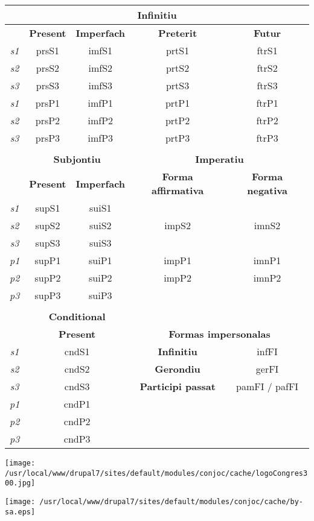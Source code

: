\documentclass[10pt,a4paper,final]{article}
\begin{document}
\begin{tabular}{|c|c|c|c|c|}
\hline 
\multicolumn{5}{|c|}{\textbf{Infinitiu}} \\ 
\hline 
 & \textbf{Present} & \textbf{Imperfach} & \textbf{Preterit} & \textbf{Futur} \\ 
\hline 
\textit{s1} & prsS1 & imfS1 & prtS1 & ftrS1 \\ 
\hline 
\textit{s2} & prsS2 & imfS2 & prtS2 & ftrS2 \\ 
\hline 
\textit{s3} & prsS3 & imfS3 & prtS3 & ftrS3 \\ 
\hline 
\textit{s1} & prsP1 & imfP1 & prtP1 & ftrP1 \\ 
\hline 
\textit{s2} & prsP2 & imfP2 & prtP2 & ftrP2 \\ 
\hline 
\textit{s3} & prsP3 & imfP3 & prtP3 & ftrP3 \\ 
\hline 
\multicolumn{5}{|c|}{} \\ 
\hline 
 & \multicolumn{2}{c|}{\textbf{Subjontiu}}  & \multicolumn{2}{c|}{\textbf{Imperatiu}} \\ 
\hline 
 & \textbf{Present} & \textbf{Imperfach} & \textbf{Forma affirmativa} & \textbf{Forma negativa} \\ 
\hline 
\textit{s1} & supS1 & suiS1 & \multicolumn{2}{c|}{} \\ 
\hline 
\textit{s2} & supS2 & suiS2 & impS2 & imnS2 \\ 
\hline 
\textit{s3} & supS3 & suiS3 & \multicolumn{2}{c|}{} \\ 
\hline 
\textit{p1} & supP1 & suiP1 & impP1 & imnP1 \\ 
\hline 
\textit{p2} & supP2 & suiP2 & impP2 & imnP2 \\ 
\hline 
\textit{p3} & supP3 & suiP3 & \multicolumn{2}{c|}{} \\ 
\hline 
\multicolumn{5}{|c|}{} \\ 
\hline 
 & \multicolumn{2}{c|}{\textbf{Conditional}} & \multicolumn{2}{c|}{} \\ 
\hline 
 &  \multicolumn{2}{c|}{\textbf{Present}} & \multicolumn{2}{c|}{\textbf{Formas impersonalas}}  \\ 
\hline 
\textit{s1} & \multicolumn{2}{c|}{cndS1}  & \textbf{Infinitiu} & infFI \\ 
\hline 
\textit{s2} & \multicolumn{2}{c|}{cndS2}  & \textbf{Gerondiu} & gerFI \\ 
\hline 
\textit{s3} & \multicolumn{2}{c|}{cndS3}  & \textbf{Participi passat} & pamFI / pafFI \\ 
\hline 
\textit{p1} & \multicolumn{2}{c|}{cndP1} & \multicolumn{2}{c|}{} \\ 
\hline 
\textit{p2} & \multicolumn{2}{c|}{cndP2} & \multicolumn{2}{c|}{} \\ 
\hline 
\textit{p3} & \multicolumn{2}{c|}{cndP3} & \multicolumn{2}{c|}{} \\ 
\hline 
\end{tabular}

\begin{center}
\texttt{[image: /usr/local/www/drupal7/sites/default/modules/conjoc/cache/logoCongres300.jpg]}
\end{center}

\hfill\texttt{[image: /usr/local/www/drupal7/sites/default/modules/conjoc/cache/by-sa.eps]}
\end{document}
